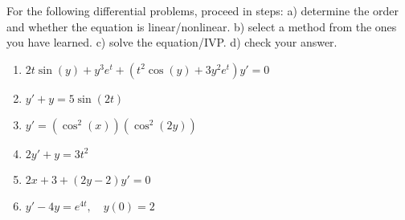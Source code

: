 \documentclass[a4paper,12pt,leqno]{article}
\begin{document}

For the following differential problems, proceed in steps: a) determine the order and whether the equation is linear/nonlinear. b) select a method from the ones you have learned. c) solve the equation/IVP. d) check your answer.
\begin{enumerate}
\item $2t \sin(y) + y^3 e^t + (t^2 \cos(y) + 3y^2 e^t) y' = 0 $
\item $y' + y = 5 \sin(2t)$
\item $y' = (\cos^2(x))(\cos^2(2y))$
\item $2y' + y = 3t^2$
\item $2x + 3 + (2y-2) y' = 0$
\item $y' -4y = e^{4t}, \quad y(0) = 2$
\end{enumerate}
\end{document}
